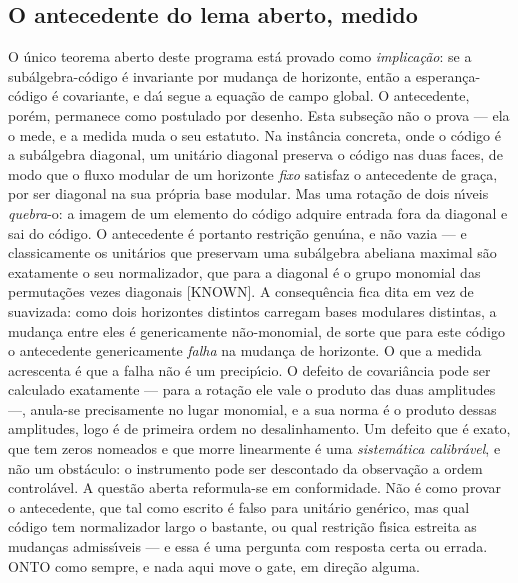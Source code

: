\documentclass[11pt]{article}
\theoremstyle{definition}\newtheorem{deriv}{Derivação}
\begin{document}
\subsection*{O antecedente do lema aberto, medido}O \'unico teorema aberto deste programa est\'a provado como \emph{implica\c{c}\~ao}: se a sub\'algebra-c\'odigo \'e invariante por mudan\c{c}a de horizonte, ent\~ao a esperan\c{c}a-c\'odigo \'e covariante, e da\'\i{} segue a equa\c{c}\~ao de campo global. O antecedente, por\'em, permanece como postulado por desenho. Esta subse\c{c}\~ao n\~ao o prova --- ela o mede, e a medida muda o seu estatuto. Na inst\^ancia concreta, onde o c\'odigo \'e a sub\'algebra diagonal, um unit\'ario diagonal preserva o c\'odigo nas duas faces, de modo que o fluxo modular de um horizonte \emph{fixo} satisfaz o antecedente de gra\c{c}a, por ser diagonal na sua pr\'opria base modular. Mas uma rota\c{c}\~ao de dois n\'\i{}veis \emph{quebra}-o: a imagem de um elemento do c\'odigo adquire entrada fora da diagonal e sai do c\'odigo. O antecedente \'e portanto restri\c{c}\~ao genu\'\i{}na, e n\~ao vazia --- e classicamente os unit\'arios que preservam uma sub\'algebra abeliana maximal s\~ao exatamente o seu normalizador, que para a diagonal \'e o grupo monomial das permuta\c{c}\~oes vezes diagonais \textsf{[KNOWN]}. A consequ\^encia fica dita em vez de suavizada: como dois horizontes distintos carregam bases modulares distintas, a mudan\c{c}a entre eles \'e genericamente n\~ao-monomial, de sorte que para este c\'odigo o antecedente genericamente \emph{falha} na mudan\c{c}a de horizonte. O que a medida acrescenta \'e que a falha n\~ao \'e um precip\'\i{}cio. O defeito de covari\^ancia pode ser calculado exatamente --- para a rota\c{c}\~ao ele vale o produto das duas amplitudes ---, anula-se precisamente no lugar monomial, e a sua norma \'e o produto dessas amplitudes, logo \'e de primeira ordem no desalinhamento. Um defeito que \'e exato, que tem zeros nomeados e que morre linearmente \'e uma \emph{sistem\'atica calibr\'avel}, e n\~ao um obst\'aculo: o instrumento pode ser descontado da observa\c{c}\~ao a ordem control\'avel. A quest\~ao aberta reformula-se em conformidade. N\~ao \'e como provar o antecedente, que tal como escrito \'e falso para unit\'ario gen\'erico, mas qual c\'odigo tem normalizador largo o bastante, ou qual restri\c{c}\~ao f\'\i{}sica estreita as mudan\c{c}as admiss\'\i{}veis --- e essa \'e uma pergunta com resposta certa ou errada. \textsf{ONTO} como sempre, e nada aqui move o gate, em dire\c{c}\~ao alguma.
\end{document}
